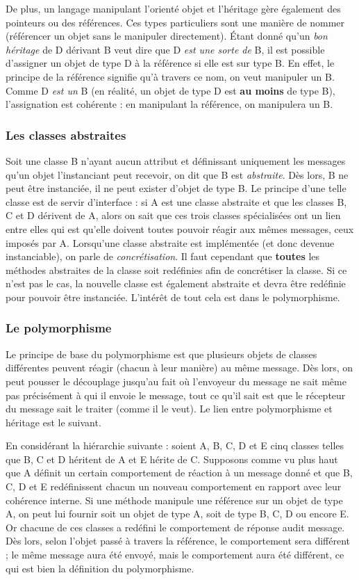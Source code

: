 \documentclass{article}
\begin{document}
		De plus, un langage manipulant l'orienté objet et l'héritage gère également des pointeurs ou des références. Ces types particuliers sont une manière de nommer (référencer
		un objet sans le manipuler directement). Étant donné qu'un \textit{bon héritage} de D dérivant B veut dire que D \textit{est une sorte de} B, il est possible d'assigner un objet
		de type D à la référence si elle est sur type B. En effet, le principe de la référence signifie qu'à travers ce nom, on veut manipuler un B. Comme D \textit{est un} B (en réalité,
		un objet de type D est \textbf{au moins} de type B), l'assignation est cohérente : en manipulant la référence, on manipulera un B.

		\subsubsection{Les classes abstraites}
			Soit une classe B n'ayant aucun attribut et définissant uniquement les messages qu'un objet l'instanciant peut recevoir, on dit que B est \textit{abstraite}. Dès lors,
			B ne peut être instanciée, il ne peut exister d'objet de type B. Le principe d'une telle classe est de servir d'interface : si A est une classe abstraite et que les
			classes B, C et D dérivent de A, alors on sait que ces trois classes spécialisées ont un lien entre elles qui est qu'elle doivent toutes pouvoir réagir aux mêmes messages,
			ceux imposés par A. Lorsqu'une classe abstraite est implémentée (et donc devenue instanciable), on parle de \textit{concrétisation}. Il faut cependant que \textbf{toutes} les
			méthodes abstraites de la classe soit redéfinies afin de concrétiser la classe. Si ce n'est pas le cas, la nouvelle classe est également abstraite et devra être redéfinie pour
			pouvoir être instanciée. L'intérêt de tout cela est dans le polymorphisme.

		\subsubsection{Le polymorphisme}
			Le principe de base du polymorphisme est que plusieurs objets de classes différentes peuvent réagir (chacun à leur manière) au même message. Dès lors, on peut pousser
			le découplage jusqu'au fait où l'envoyeur du message ne sait même pas précisément à qui il envoie le message, tout ce qu'il sait est que le récepteur du message sait le
			traiter (comme il le veut). Le lien entre polymorphisme et héritage est le suivant.
			
			En considérant la hiérarchie suivante : soient A, B, C, D et E cinq classes telles que B, C et D héritent de A et E hérite de C. Supposons comme vu plus haut que A définit un
			certain comportement de réaction à un message donné et que B, C, D et E redéfinissent chacun un nouveau comportement en rapport avec leur cohérence interne. Si une méthode
			manipule une référence sur un objet de type A, on peut lui fournir soit un objet de type A, soit de type B, C, D ou encore E. Or chacune de ces classes a redéfini le comportement
			de réponse audit message. Dès lors, selon l'objet passé à travers la référence, le comportement sera différent ; le même message aura été envoyé, mais le comportement aura été
			différent, ce qui est bien la définition du polymorphisme.
\end{document}
